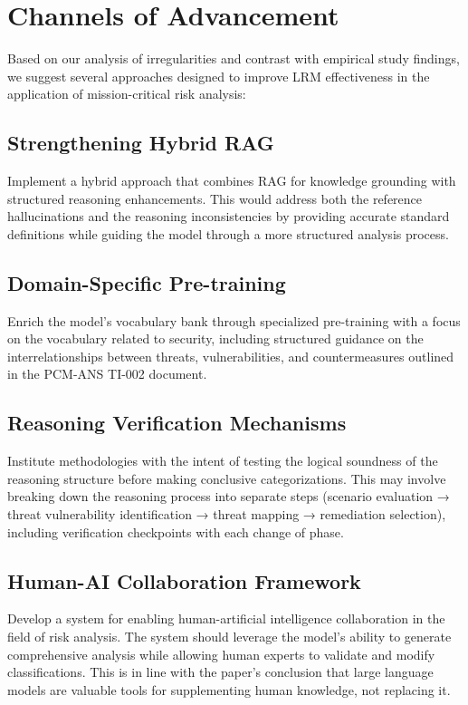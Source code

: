 \documentclass[sigconf]{acmart}
\begin{document}
\section{Channels of Advancement}
Based on our analysis of irregularities and contrast with empirical study findings, we suggest several approaches designed to improve LRM effectiveness in the application of mission-critical risk analysis:

\subsection{Strengthening Hybrid RAG}
Implement a hybrid approach that combines RAG for knowledge grounding with structured reasoning enhancements. This would address both the reference hallucinations and the reasoning inconsistencies by providing accurate standard definitions while guiding the model through a more structured analysis process.

\subsection{Domain-Specific Pre-training}
Enrich the model's vocabulary bank through specialized pre-training with a focus on the vocabulary related to security, including structured guidance on the interrelationships between threats, vulnerabilities, and countermeasures outlined in the PCM-ANS TI-002 document.

\subsection{Reasoning Verification Mechanisms}
Institute methodologies with the intent of testing the logical soundness of the reasoning structure before making conclusive categorizations. This may involve breaking down the reasoning process into separate steps (scenario evaluation → threat vulnerability identification → threat mapping → remediation selection), including verification checkpoints with each change of phase.

\subsection{Human-AI Collaboration Framework}
Develop a system for enabling human-artificial intelligence collaboration in the field of risk analysis. The system should leverage the model's ability to generate comprehensive analysis while allowing human experts to validate and modify classifications. This is in line with the paper's conclusion that large language models are valuable tools for supplementing human knowledge, not replacing it.
\end{document}
